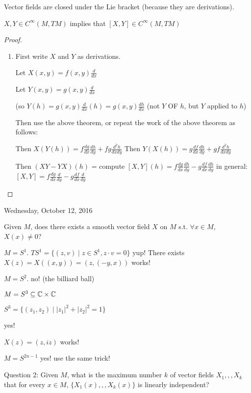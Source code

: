 \documentclass[11pt,leqno,oneside]{amsart}
\newcommand{\x}{\times}
\theoremstyle{mystyle} \newtheorem{thrm}[thm]{Theorem}
\theoremstyle{mystyle} \newtheorem{defi}[thm]{Definition}
\begin{document}
\begin{example}
	Vector fields are closed under the Lie bracket (because they are derivations).

	$X, Y \in C^\infty(M, TM)$ implies that $[X,Y] \in C^\infty(M, TM)$
\end{example}
\begin{proof}
	\begin{enumerate}
		\item
		First write $X$ and $Y$ as derivations.

		Let $X(x,y) = f(x,y)\frac{d}{dx}$

		Let $Y(x,y) = g(x,y)\frac{d}{dx}$

		(so $Y(h) = g(x,y)\frac{d}{dx}(h) = g(x,y)\frac{dh}{dx}$  (not $Y$ OF $h$, but $Y$ applied to $h$)

Then use the above theorem, or repeat the work of the above theorem as follows:

		Then $X(Y(h)) = f \frac{dg}{dx} \frac{dh}{dy} + fg \frac{d^2h}{dxdy}$
		Then $Y(X(h)) = g \frac{df}{dx} \frac{dh}{dy} + gf \frac{d^2h}{dxdy}$

		Then $(XY - YX)(h)$ = compute
		$[X,Y](h) = f \frac{dg}{dx} \frac{dh}{dy} - g \frac{df}{dx} \frac{dh}{dy}$
		in general:
		$[X,Y] = f \frac{dg}{dx} \frac{d}{dy} - g \frac{df}{dx} \frac{d}{dy}$
	\end{enumerate}
\end{proof}

Wednesday, October 12, 2016

Given $M$, does there exists a smooth vector field $X$ on $M$ s.t. $\forall x \in M$, $X(x) \neq 0$?

\begin{example}
	$M = S^1$.  $TS^1 = \{ (z,v) \mid z \in S^1, z \cdot v = 0 \}$
	yup!  There exists
	$X(z) = X((x,y)) = (z, (-y,x))$ works!
\end{example}
\begin{example}
	$M = S^2$.
	no! (the billiard ball)
\end{example}
\begin{example}
	$M = S^3 \subseteq \C \x \C$

	$S^3 = \{ (z_1,z_2) \mid |z_1|^2 + |z_2|^2 = 1 \}$

	yes!

	$X(z) = (z, iz)$ works!
\end{example}
\begin{example}
	$M = S^{2n-1}$
	yes!
	use the same trick!
\end{example}
Question 2:
Given $M$, what is the maximum number $k$ of vector fields $X_1,,,X_k$ that for every $x \in M$, $\{X_1(x),,,X_k(x)\}$ is linearly independent?
\end{document}
